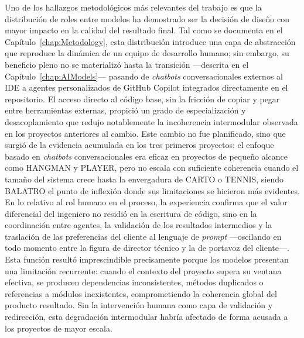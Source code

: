 Uno de los hallazgos metodológicos más relevantes del trabajo es que la distribución de roles entre modelos ha demostrado ser la decisión de diseño con mayor impacto en la calidad del resultado final. Tal como se documenta en el Capítulo~\ref{chap:Metodology}, esta distribución introduce una capa de abstracción que reproduce la dinámica de un equipo de desarrollo humano; sin embargo, su beneficio pleno no se materializó hasta la transición ---descrita en el Capítulo~\ref{chap:AIModels}--- pasando de \textit{chatbots} conversacionales externos al \ac{IDE} a agentes personalizados de GitHub Copilot integrados directamente en el repositorio. El acceso directo al código base, sin la fricción de copiar y pegar entre herramientas externas, propició un grado de especialización y desacoplamiento que redujo notablemente la incoherencia intermodular observada en los proyectos anteriores al cambio. Este cambio no fue planificado, sino que surgió de la evidencia acumulada en los tres primeros proyectos: el enfoque basado en \textit{chatbots} conversacionales era eficaz en proyectos de pequeño alcance como \ac{HANGMAN} y \ac{PLAYER}, pero no escala con suficiente coherencia cuando el tamaño del sistema crece hasta la envergadura de \ac{CARTO} o \ac{TENNIS}, siendo \ac{BALATRO} el punto de inflexión donde sus limitaciones se hicieron más evidentes.\\

En lo relativo al rol humano en el proceso, la experiencia confirma que el valor diferencial del ingeniero no residió en la escritura de código, sino en la coordinación entre agentes, la validación de los resultados intermedios y la traslación de las preferencias del cliente al lenguaje de \textit{prompt} —oscilando en todo momento entre la figura de director técnico y la de portavoz del cliente—. Esta función resultó imprescindible precisamente porque los modelos presentan una limitación recurrente: cuando el contexto del proyecto supera su ventana efectiva, se producen dependencias inconsistentes, métodos duplicados o referencias a módulos inexistentes, comprometiendo la coherencia global del producto resultado. Sin la intervención humana como capa de validación y redirección, esta degradación intermodular habría afectado de forma acusada a los proyectos de mayor escala.\\

